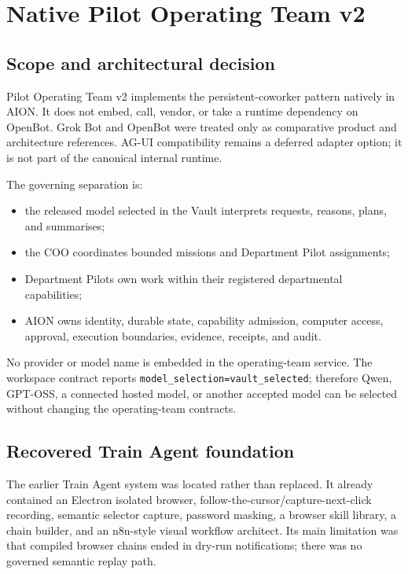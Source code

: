 
\section{Native Pilot Operating Team v2}
\label{sec:pilot-operating-team-v2}

\subsection{Scope and architectural decision}

Pilot Operating Team v2 implements the persistent-coworker pattern natively in
AION.  It does not embed, call, vendor, or take a runtime dependency on
OpenBot.  Grok Bot and OpenBot were treated only as comparative product and
architecture references.  AG-UI compatibility remains a deferred adapter
option; it is not part of the canonical internal runtime.

The governing separation is:
\begin{itemize}[leftmargin=*]
\item the released model selected in the Vault interprets requests, reasons,
plans, and summarises;
\item the COO coordinates bounded missions and Department Pilot assignments;
\item Department Pilots own work within their registered departmental
capabilities;
\item AION owns identity, durable state, capability admission, computer access,
approval, execution boundaries, evidence, receipts, and audit.
\end{itemize}
No provider or model name is embedded in the operating-team service.  The
workspace contract reports \texttt{model\_selection=vault\_selected}; therefore
Qwen, GPT-OSS, a connected hosted model, or another accepted model can be
selected without changing the operating-team contracts.

\subsection{Recovered Train Agent foundation}

The earlier Train Agent system was located rather than replaced.  It already
contained an Electron isolated browser, follow-the-cursor/capture-next-click
recording, semantic selector capture, password masking, a browser skill
library, a chain builder, and an n8n-style visual workflow architect.  Its main
limitation was that compiled browser chains ended in dry-run notifications;
there was no governed semantic replay path.

